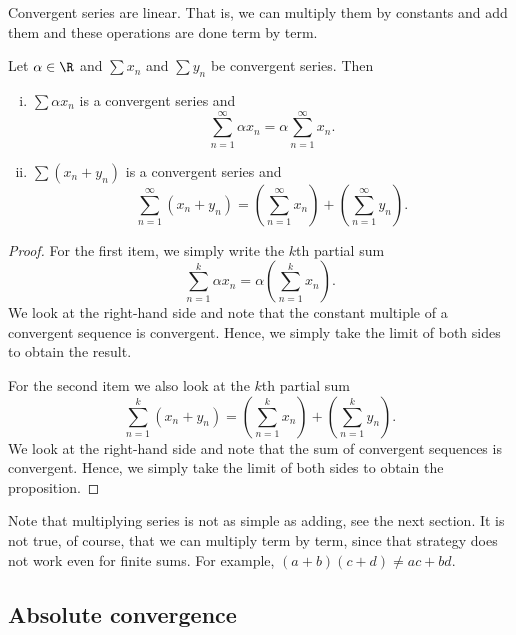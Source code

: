 \documentclass[12pt]{book}
\begin{document}
Convergent series are linear.
That is, we can multiply them by constants
and add them and these operations are done term by term.

\begin{prop}
Let $\alpha \in \R$ and $\sum x_n$ and $\sum y_n$ be
convergent series.
Then
\begin{enumerate}[(i)]
\item
$\sum \alpha x_n$ is a convergent series and
\begin{equation*}
\sum_{n=1}^\infty \alpha x_n
=
\alpha \sum_{n=1}^\infty x_n .
\end{equation*}
\item
$\sum ( x_n + y_n )$ is a convergent series and
\begin{equation*}
\sum_{n=1}^\infty ( x_n + y_n ) 
=
\left( \sum_{n=1}^\infty x_n \right)
+
\left( \sum_{n=1}^\infty y_n \right) .
\end{equation*}
\end{enumerate}
\end{prop}

\begin{proof}
For the first item,
we simply write the $k$th partial sum
\begin{equation*}
\sum_{n=1}^k \alpha x_n
=
\alpha \left( \sum_{n=1}^k x_n \right) .
\end{equation*}
We look at the right-hand side and note that the constant multiple of
a convergent sequence
is convergent.
Hence, we simply take the limit of both sides to obtain
the result.

For the second item we also look at the
$k$th partial sum
\begin{equation*}
\sum_{n=1}^k ( x_n + y_n ) 
=
\left( \sum_{n=1}^k x_n \right)
+
\left( \sum_{n=1}^k y_n \right) .
\end{equation*}
We look at the right-hand side and note that the sum of convergent sequences
is convergent.
Hence, we simply take the limit of both sides to obtain
the proposition.
\end{proof}

Note that multiplying series is not as simple as adding, see the next
section.
It is not true, of course, that we can multiply
term by term, since that strategy does not work even for finite sums.
For example, $(a+b)(c+d) \not= ac+bd$.

\subsection*{Absolute convergence}
\end{document}
